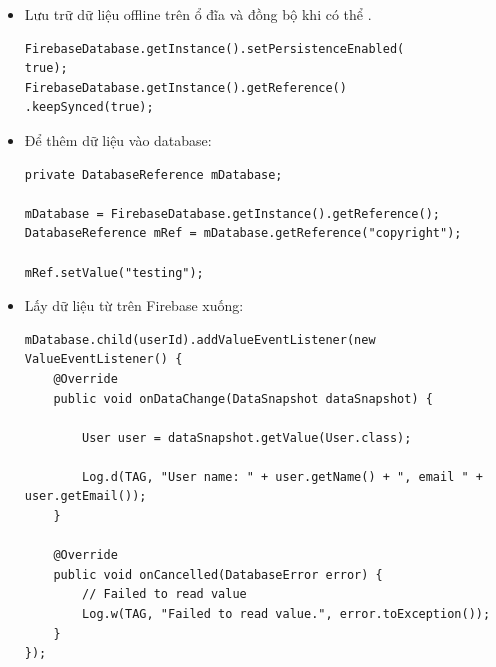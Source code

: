 \begin{itemize}
	\item Lưu trữ dữ liệu offline trên ổ đĩa và đồng bộ khi có thể .\begin{lstlisting}[frame=single, style=javacode, breaklines=true]
FirebaseDatabase.getInstance().setPersistenceEnabled(
true);
FirebaseDatabase.getInstance().getReference()
.keepSynced(true);

	\end{lstlisting}
	\pagebreak
	\item Để thêm dữ liệu vào database:
	\begin{lstlisting}[frame=single, style=javacode, breaklines=true]
private DatabaseReference mDatabase;

mDatabase = FirebaseDatabase.getInstance().getReference();
DatabaseReference mRef = mDatabase.getReference("copyright");

mRef.setValue("testing");

	\end{lstlisting}

	\item Lấy dữ liệu từ trên Firebase xuống:\begin{lstlisting}[frame=single, style=javacode, breaklines=true]
mDatabase.child(userId).addValueEventListener(new ValueEventListener() {
    @Override
    public void onDataChange(DataSnapshot dataSnapshot) {

        User user = dataSnapshot.getValue(User.class);

        Log.d(TAG, "User name: " + user.getName() + ", email " + user.getEmail());
    }

    @Override
    public void onCancelled(DatabaseError error) {
        // Failed to read value
        Log.w(TAG, "Failed to read value.", error.toException());
    }
});

	\end{lstlisting}
\end{itemize}

